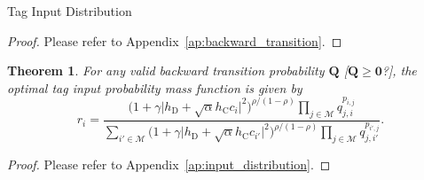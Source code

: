 \documentclass[journal]{IEEEtran}
\newtheorem{theorem}{Theorem}
\begin{document}
\begin{section}{Tag Input Distribution}
\begin{proof}
			Please refer to Appendix~\ref{ap:backward_transition}.
		\end{proof}
		\begin{theorem}
			For any valid backward transition probability $\boldsymbol{Q}$ [$\boldsymbol{Q} \ge \boldsymbol{0}$?], the optimal tag input probability mass function is given by
			\begin{equation}
				r_i = \frac{\bigl( 1 + \gamma \lvert h_{\mathrm{D}} + \sqrt{\alpha} h_{\mathrm{C}} c_i \rvert^2 \bigr)^{\rho / (1 - \rho)} \prod_{j \in \mathcal{M}} q_{j, i}^{p_{i, j}}}{\sum_{i' \in \mathcal{M}} \bigl( 1 + \gamma \lvert h_{\mathrm{D}} + \sqrt{\alpha} h_{\mathrm{C}} c_{i'} \rvert^2 \bigr)^{\rho / (1 - \rho)} \prod_{j \in \mathcal{M}} q_{j, i'}^{p_{i', j}}}.
				\label{eq:input_distribution}
			\end{equation}
			\label{th:input_distribution}
		\end{theorem}
		\begin{proof}
			Please refer to Appendix~\ref{ap:input_distribution}.
		\end{proof}

	\end{section}
\end{document}

